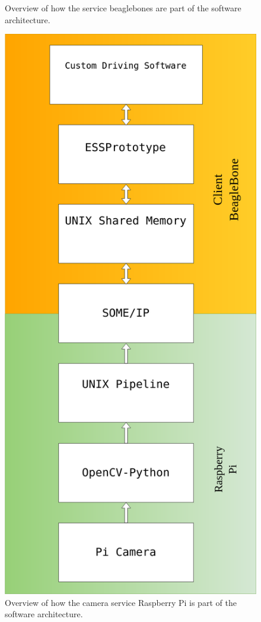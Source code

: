 \documentclass[11pt, titlepage]{article} %
\begin{document}
\begin{figure}[H]
   	\caption{Overview of how the service beaglebones are part of the software architecture.}
    \label{fig:bbb_arch}
\end{figure}

\begin{figure}[H]
	\centering
   	\includegraphics[scale=0.25]{arch_rpi.png}
   	\caption{Overview of how the camera service Raspberry Pi is part of the software architecture.}
    \label{fig:rpi_arch}
\end{figure}
\end{document}
